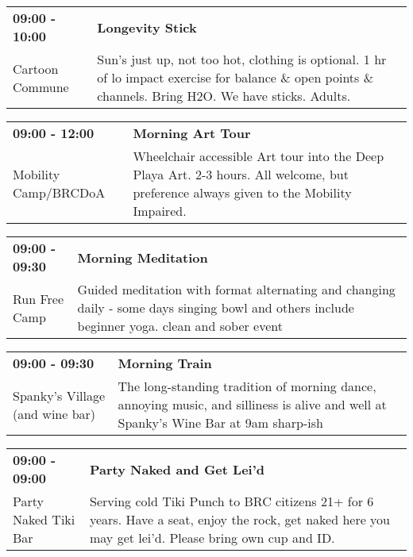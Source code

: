 \begin{tabular}{ p{1in} p{2.2in} }
    \textbf{09:00 - 10:00} & \textbf{Longevity Stick} \\
    Cartoon Commune \newline  & Sun's just up, not too hot, clothing is optional. 1 hr of lo impact exercise for balance \& open points \& channels. Bring H2O. We have sticks. Adults. \\
    \hline 
\end{tabular}
    
\begin{tabular}{ p{1in} p{2.2in} }
    \textbf{09:00 - 12:00} & \textbf{Morning Art Tour} \\
    Mobility Camp/BRCDoA \newline  & Wheelchair accessible Art tour into the Deep Playa Art.
2-3 hours. All welcome, but preference always given to the Mobility Impaired. \\
    \hline 
\end{tabular}
    
\begin{tabular}{ p{1in} p{2.2in} }
    \textbf{09:00 - 09:30} & \textbf{Morning Meditation} \\
    Run Free Camp \newline  & Guided meditation with format alternating and changing daily - some days singing bowl and others include beginner yoga. clean and sober event \\
    \hline 
\end{tabular}
    
\begin{tabular}{ p{1in} p{2.2in} }
    \textbf{09:00 - 09:30} & \textbf{Morning Train} \\
    Spanky's Village (and wine bar) \newline  & The long-standing tradition of morning dance, annoying music, and silliness is alive and well at Spanky's Wine Bar at 9am sharp-ish \\
    \hline 
\end{tabular}
    
\begin{tabular}{ p{1in} p{2.2in} }
    \textbf{09:00 - 09:00} & \textbf{Party Naked and Get Lei'd} \\
    Party Naked Tiki Bar \newline  & Serving cold Tiki Punch to BRC citizens 21+ for 6 years. Have a seat, enjoy the rock, get naked here you may get lei'd. Please bring own cup and ID. \\
    \hline 
\end{tabular}
    
